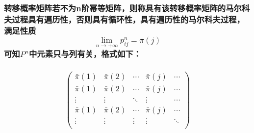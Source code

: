\documentclass[11pt]{article}
\begin{document}
\subsubsection{\texorpdfstring{转移概率矩阵若不为n阶幂等矩阵，则称具有该转移概率矩阵的马尔科夫过程具有遍历性，否则具有循环性，具有遍历性的马尔科夫过程，满足性质\[\lim_{n\to+\infty}p_{ij}^n=\bar\pi(j)\]可知\(P^n\)中元素只与列有关，格式如下：}{转移概率矩阵若不为n阶幂等矩阵，则称具有该转移概率矩阵的马尔科夫过程具有遍历性，否则具有循环性，具有遍历性的马尔科夫过程，满足性质\textbackslash{}lim\_\{n\textbackslash{}to+\textbackslash{}infty\}p\_\{ij\}\^{}n=\textbackslash{}bar\textbackslash{}pi(j)可知P\^{}n中元素只与列有关，格式如下：}}\label{ux8f6cux79fbux6982ux7387ux77e9ux9635ux82e5ux4e0dux4e3anux9636ux5e42ux7b49ux77e9ux9635ux5219ux79f0ux5177ux6709ux8be5ux8f6cux79fbux6982ux7387ux77e9ux9635ux7684ux9a6cux5c14ux79d1ux592bux8fc7ux7a0bux5177ux6709ux904dux5386ux6027ux5426ux5219ux5177ux6709ux5faaux73afux6027ux5177ux6709ux904dux5386ux6027ux7684ux9a6cux5c14ux79d1ux592bux8fc7ux7a0bux6ee1ux8db3ux6027ux8d28lim_ntoinftyp_ijnbarpijux53efux77e5pnux4e2dux5143ux7d20ux53eaux4e0eux5217ux6709ux5173ux683cux5f0fux5982ux4e0b}

\subsubsection{\texorpdfstring{\[
        \left (\begin{matrix}
        \bar\pi(1) & \bar\pi(2) & \cdots &\bar\pi(j)& \cdots  \\
        \bar\pi(1)  & \bar\pi(2) & \cdots &\bar\pi(j)& \cdots \\
        \vdots & \vdots & \ddots & \vdots & \cdots \\
       \bar\pi(1) & \bar\pi(2) & \cdots & \bar\pi(j) & \cdots \\
        \vdots & \vdots & \vdots & \vdots & \ddots \\
        \end{matrix} \right)\]}{
        \textbackslash{}left (\textbackslash{}begin\{matrix\}
        \textbackslash{}bar\textbackslash{}pi(1) \& \textbackslash{}bar\textbackslash{}pi(2) \& \textbackslash{}cdots \&\textbackslash{}bar\textbackslash{}pi(j)\& \textbackslash{}cdots  \textbackslash{}\textbackslash{}
        \textbackslash{}bar\textbackslash{}pi(1)  \& \textbackslash{}bar\textbackslash{}pi(2) \& \textbackslash{}cdots \&\textbackslash{}bar\textbackslash{}pi(j)\& \textbackslash{}cdots \textbackslash{}\textbackslash{}
        \textbackslash{}vdots \& \textbackslash{}vdots \& \textbackslash{}ddots \& \textbackslash{}vdots \& \textbackslash{}cdots \textbackslash{}\textbackslash{}
       \textbackslash{}bar\textbackslash{}pi(1) \& \textbackslash{}bar\textbackslash{}pi(2) \& \textbackslash{}cdots \& \textbackslash{}bar\textbackslash{}pi(j) \& \textbackslash{}cdots \textbackslash{}\textbackslash{}
        \textbackslash{}vdots \& \textbackslash{}vdots \& \textbackslash{}vdots \& \textbackslash{}vdots \& \textbackslash{}ddots \textbackslash{}\textbackslash{}
        \textbackslash{}end\{matrix\} \textbackslash{}right)}}\label{left-beginmatrix-barpi1-barpi2-cdots-barpij-cdots-barpi1-barpi2-cdots-barpij-cdots-vdots-vdots-ddots-vdots-cdots-barpi1-barpi2-cdots-barpij-cdots-vdots-vdots-vdots-vdots-ddots-endmatrix-right}
\end{document}
